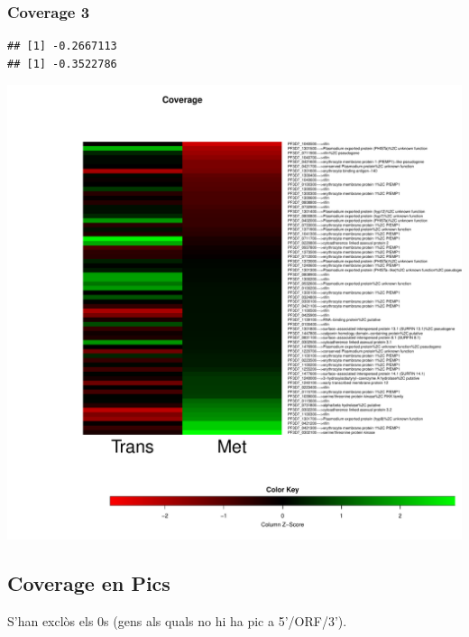 \documentclass{article}\usepackage[]{graphicx}\usepackage[]{color}
\makeatletter
\newenvironment{kframe}{%
 \def\at@end@of@kframe{}%
 \ifinner\ifhmode%
  \def\at@end@of@kframe{\end{minipage}}%
  \begin{minipage}{\columnwidth}%
 \fi\fi%
 \def\FrameCommand##1{\hskip\@totalleftmargin \hskip-\fboxsep
 \colorbox{shadecolor}{##1}\hskip-\fboxsep
     \hskip-\linewidth \hskip-\@totalleftmargin \hskip\columnwidth}%
 \MakeFramed {\advance\hsize-\width
   \@totalleftmargin\z@ \linewidth\hsize
   \@setminipage}}%
 {\par\unskip\endMakeFramed%
 \at@end@of@kframe}
\newenvironment{knitrout}{}{} %
\makeatother
\begin{document}
\subsubsection{Coverage 3}
\begin{knitrout}
\color{fgcolor}\begin{kframe}
\begin{verbatim}
## [1] -0.2667113
## [1] -0.3522786
\end{verbatim}
\end{kframe}

{\centering \includegraphics[width=.9\linewidth]{figure/minimal-met_cov_3-1} 

}



\end{knitrout}
\clearpage

\subsection{Coverage en Pics}
S'han exclòs els 0s (gens als quals no hi ha pic a 5'/ORF/3').
\end{document}
